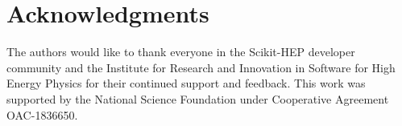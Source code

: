 \section{Acknowledgments}\label{sec:acknowledgements}

The authors would like to thank everyone in the Scikit-HEP developer community and the Institute for Research and Innovation in Software for High Energy Physics for their continued support and feedback.
This work was supported by the National Science Foundation under Cooperative Agreement OAC-1836650.
